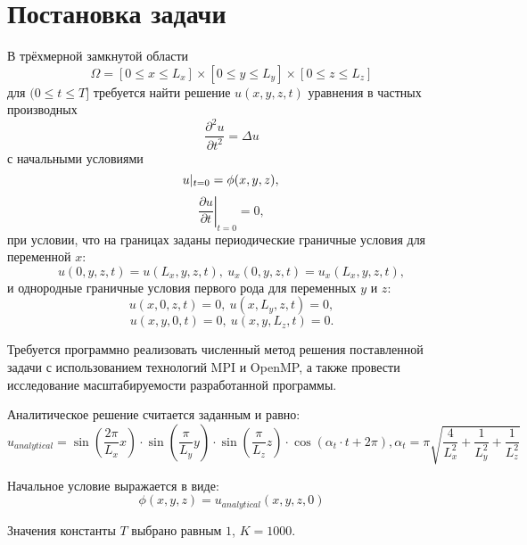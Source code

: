 \section{Постановка задачи}
\label{sec:Statement} 

В трёхмерной замкнутой области
$$
\Omega = [ 0 \leqslant x \leqslant L_x ] \times [ 0 \leqslant y \leqslant L_y ] \times [ 0 \leqslant z \leqslant L_z ]
$$
для $(0 \le t \leqslant T]$ требуется найти решение $u(x,y,z,t)$ уравнения в частных производных 
\begin{equation}
\frac{\partial^2 u}{\partial t^2} = \Delta u
\label{eq:gen}
\end{equation}
с начальными условиями
$$
u |_{t=0} = \phi(x,y,z), \\
$$
$$
\left. \frac{\partial u}{\partial t} \right |_{t=0} = 0,
$$
при условии, что на границах заданы периодические граничные условия для переменной $x$:
$$
u(0,y,z,t) = u(L_x,y,z,t),\ u_x(0,y,z,t) = u_x(L_x,y,z,t),
$$
и однородные граничные условия первого рода для переменных $y$ и $z$:
$$
u(x,0,z,t) = 0,\ u(x,L_y,z,t) = 0,
$$
$$
u(x,y,0,t) = 0,\ u(x,y,L_z,t) = 0.
$$

Требуется программно реализовать численный метод решения поставленной задачи с использованием технологий MPI и OpenMP, а также провести исследование масштабируемости разработанной программы.

Аналитическое решение считается заданным и равно:
$$
u_{analytical} = \sin(\frac{2\pi}{L_x} x) \cdot \sin(\frac{\pi}{L_y} y) \cdot \sin(\frac{\pi}{L_z} z) \cdot \cos(\alpha_t \cdot t + 2\pi), \alpha_t = \pi \sqrt{\frac{4}{L_x^2} + \frac{1}{L_y^2} + \frac{1}{L_z^2}}
$$

Начальное условие выражается в виде:
$$
\phi(x,y,z) = u_{analytical}(x,y,z,0)
$$

Значения константы $T$ выбрано равным $1$, $K = 1000$.